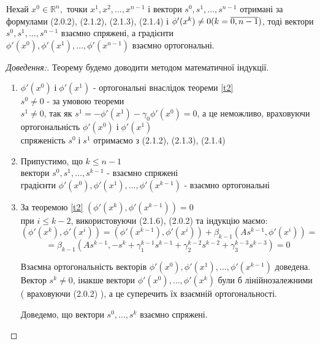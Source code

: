 \begin{thm} \label{t3}
	$ \text{Нехай } x^0 \in \mathbb{R}^n , \text{ точки } x^1, x^2, \ldots , x^{n-1} \text{ і вектори } s^0, s^1, \ldots, s^{n-1} $ отримані за формулами  (2.0.2), (2.1.2), (2.1.3), (2.1.4) і 
	$ \phi'(x^k) \neq 0 \\ (k = \overline{0,n-1}) $, тоді вектори $  s^0, s^1, \ldots, s^{n-1} $ взаємно спряжені, а градієнти \\ $  \phi'(x^0), \phi'(x^1), \ldots,  \phi'(x^{n-1}) $ взаємно ортогональні.
\end{thm}
\begin{proof}[Доведення:]
	Теорему будемо доводити методом математичної індукції.
	\begin{enumerate}
		\item $  \phi'(x^0) \; і \; \phi'(x^1) $ - ортогональні внаслідок теореми \ref{t2} \\
		$s^0 \neq 0 $ - за умовою теореми \\
		$s^1 \neq 0 $, так як $s^1 = - \phi'(x^1) - \gamma_0\phi'(x^0) = 0 $, а це неможливо, враховуючи ортогональність  $  \phi'(x^0) \; і \; \phi'(x^1) $ \\
		спряженість $s^0 \; і \; s^1 $ отримаємо з (2.1.2), (2.1.3), (2.1.4) 
		\item Припустимо, що $k \leq n - 1$ \\
		вектори $  s^0, s^1, \ldots, s^{k-1} $ -  взаємно спряжені \\
		градієнти  $  \phi'(x^0), \phi'(x^1), \ldots,  \phi'(x^{k-1}) $ - взаємно ортогональні
		\item За теоремою \ref{t2} $(\phi'(x^k), \phi'(x^{k-1})) = 0 $ \\
		при $ i \leq k - 2 $, використовуючи (2.1.6), (2.0.2) та індукцію маємо:
		$$ ( \phi'(x^k),  \phi'(x^i)) = (\phi'(x^{k-1}),  \phi'(x^i)) + \beta_{k-1}(As^{k-1},  \phi'(x^i)) = $$
		$$ = \beta_{k-1}(As^{k-1}, - s^k + \gamma_1^{k-1}s^{k-1} + \gamma_2^{k-2}s^{k-2} + \gamma_3^{k-3}s^{k-3}) = 0 $$ 
		
		Взаємна ортогональність векторів  $  \phi'(x^0), \phi'(x^1), \ldots,  \phi'(x^{k-1}) $ доведена. \\
		Вектор $s^k \neq 0 $, інакше вектори  $  \phi'(x^0), \ldots,  \phi'(x^k) $  були б лінійнозалежними ( враховуючи (2.0.2) ), а це суперечить їх взаємній ортогональності.
		
		Доведемо, що вектори $  s^0, \ldots, s^k $  взаємно спряжені.
		

\end{enumerate}
\end{proof}
